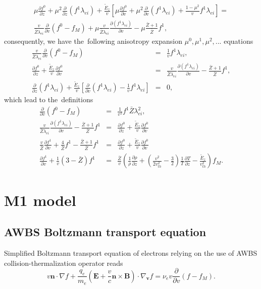 \documentclass[preprint,12pt]{elsarticle}
\newcommand{\pdv}[2]{\frac{\partial{#1}}{\partial{#2}}}
\newcommand{\vect}[1]{\boldsymbol{#1}}
\newcommand{\mfpei}{\lambda_{ei}}
\newcommand{\Zbar}{\bar{Z}}
\newcommand{\nue}{\nu_{e}}
\newcommand{\vmag}{v}
\newcommand{\vth}{v_{th}}
\newcommand{\vn}{\vect{n}}
\newcommand{\E}{\vect{E}}
\newcommand{\B}{\vect{B}}
\newcommand{\qe}{q_e}
\newcommand{\me}{m_e}
\newcommand{\fM}{f_M}
\newcounter{bla}
\begin{document}
\begin{multline}
  \mu\pdv{f^0}{z} + \mu^2 \pdv{}{z}\left(f^1 \mfpei \right)
  + \frac{\tilde{E}_z}{\vmag} \left[ \mu \pdv{f^0}{\vmag} 
  + \mu^2 \pdv{}{\vmag} \left( f^1 \mfpei \right) 
  + \frac{1 - \mu^2}{\vmag}f^1 \mfpei
  \right] 
  =\\
  \frac{\vmag}{\Zbar\mfpei}\pdv{}{\vmag}
  \left( f^0 -\fM\right)
  + \mu\frac{\vmag}{\Zbar\mfpei}\pdv{\left(f^1 \mfpei\right)}{\vmag} 
  - \mu \frac{\Zbar + 1}{\Zbar}f^1 ,
  \label{eq:AWBS_spherical}
\end{multline}
consequently, we have the~following anisotropy expansion 
$\mu^0, \mu^1, \mu^2, ...$ equations
\begin{eqnarray}
  \frac{\vmag}{\Zbar\mfpei}\pdv{}{\vmag}
  \left( f^0 -\fM\right) &=& \frac{1}{\vmag}f^1 \mfpei , 
  \nonumber \\
  \pdv{f^0}{z} + \frac{\tilde{E}_z}{\vmag}\pdv{f^0}{\vmag} &=& 
  \frac{\vmag}{\Zbar\mfpei}\pdv{\left(f^1 \mfpei\right)}{\vmag}  
  - \frac{\Zbar + 1}{\Zbar} f^1 , 
  \nonumber \\ 
  \pdv{}{z}\left(f^1 \mfpei \right) 
  + \frac{\tilde{E}_z}{\vmag} \left[\pdv{}{\vmag} \left( f^1 \mfpei \right)
  - \frac{1}{\vmag}f^1 \mfpei \right] &=& 0 , \nonumber
\end{eqnarray}
which lead to the~definitions
\begin{eqnarray}
  \pdv{}{\vmag}\left( f^0 -\fM\right) &=& \frac{1}{\vmag^2}f^1 \Zbar\mfpei^2 ,
  \label{eq:AWBS_f0} \\
  \frac{\vmag}{\Zbar\mfpei}\pdv{\left(f^1 \mfpei\right)}{\vmag}  
  - \frac{\Zbar + 1}{\Zbar} f^1 &=&
  \pdv{f^0}{z} + \frac{\tilde{E}_z}{\vmag}\pdv{f^0}{\vmag}
  \nonumber \\  
  \frac{\vmag}{\Zbar}\pdv{f^1}{\vmag} + \frac{4}{\Zbar}f^1 
  - \frac{\Zbar + 1}{\Zbar} f^1 &=&
  \pdv{f^0}{z} + \frac{\tilde{E}_z}{\vmag}\pdv{f^0}{\vmag}
  \nonumber \\
  \pdv{f^1}{\vmag} + \frac{1}{\vmag}(3-\Zbar)f^1
  &=&
  \frac{\Zbar}{\vmag}\left(\frac{1}{\rho}\pdv{\rho}{z} + 
  \left( \frac{\vmag^2}{2 \vth^2} - \frac{3}{2}\right)
  \frac{1}{T}\pdv{T}{z} - \frac{\tilde{E}_z}{\vth^2}\right)\fM .
  \label{eq:AWBS_f1}
\end{eqnarray}

\section{M1 model}\label{sec:m1_model}
\subsection{AWBS Boltzmann transport equation}
Simplified Boltzmann transport equation of electrons relying on the use of AWBS
collision-thermalization operator \cite{AWBS_PRL1986} reads
\begin{equation}
  \vmag\vn\cdot\nabla f + \frac{\qe}{\me}\left( \E + 
  \frac{\vmag}{c}\vn\times\B\right)\cdot\nabla_{\vect{v}} f = \nue \vmag 
  \pdv{}{\vmag}\left( f - \fM\right) .
  \label{eq:AWBS}
\end{equation}
\end{document}
